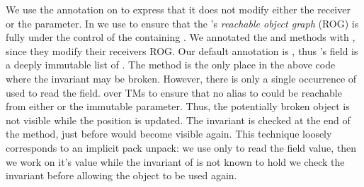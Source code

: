 We use the \Q@read@ annotation on \Q@equals@ to express that it does not modify either the
receiver or the parameter. In \Q@Cage@ we use \Q@capsule@ to ensure
that the \Q@Hamster@'s \emph{reachable object graph} (ROG) is fully under the control
of the containing \Q@Cage@. 
We annotated the \Q@move@
and \Q@moveTo@ methods with \Q@mut@, since they modify
their receivers ROG. Our default annotation is \Q@imm@, thus \Q@Cage@'s \Q@path@ field is a deeply immutable list of \Q@Point@s.
The \Q@moveTo@ method is the only place in the above code where the invariant may be broken. However, there is only a single occurrence of \Q@this@ {} used to read the \Q@h@ field.  over TMs to ensure that no alias to \Q@this@ could be reachable from either \Q@h@ or the immutable \Q@Point@ parameter. Thus, the potentially broken \Q@this@ object is not visible while the  position is updated. 
The invariant is checked at the end of the \Q@moveTo@ method, just before \Q@this@ would become visible again.
This technique loosely corresponds to an implicit pack  unpack: we use \Q@this@ only to read the field value, then we work on it's value while the invariant of \Q@this@ is not known to hold we check the invariant before allowing the object to  be used again.


